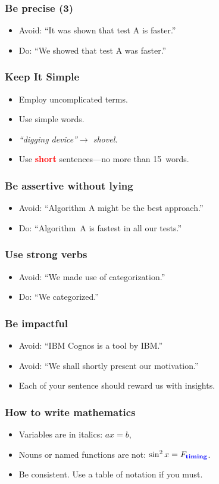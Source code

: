 \documentclass[handout]{beamer}
\newcommand{\vimportant}[1]{\textcolor{red}{\textbf{#1}}}
\newcommand{\important}[1]{\textcolor{blue}{\textbf{#1}}}
\begin{document}
 \frame
{
  \frametitle{Be precise (3)}
  \begin{itemize}
 \item<1->           Avoid: ``It was shown that test A is faster.''
  \item<2-> Do: ``We showed that test A was faster.''
 \end{itemize}
 }

\frame
{
  \frametitle{Keep It Simple}
  \begin{itemize}
  \item<1->  Employ uncomplicated terms.
  \item<2->  Use simple words.
  \item<3-> \emph{``digging device''$\to$  shovel.}
    \item<4->  Use \vimportant{short} sentences---no more than 15~words.
 \end{itemize}
 }


\frame
{
  \frametitle{Be assertive without lying}
  \begin{itemize}
  \item<1-> Avoid: ``Algorithm A might be the best approach.''
  \item<2-> Do: ``Algorithm~A is fastest in all our tests.''
 \end{itemize}
 }

\frame
{
  \frametitle{Use strong verbs}
  \begin{itemize}
  \item<1-> Avoid: ``We made use of categorization.''
  \item<2-> Do: ``We categorized.''
 \end{itemize}
 }

\frame
{
  \frametitle{Be impactful}
  \begin{itemize}
  \item<1-> Avoid: ``IBM Cognos is a tool by IBM.''
  \item<2-> Avoid: ``We shall shortly present our motivation.''
  \item<3-> Each of your sentence should reward us with insights.

 \end{itemize}
 }



\frame
{
  \frametitle{How to write mathematics}
  \begin{itemize}
  \item<1->  Variables are in italics: $a x = b$,
  \item<2-> Nouns or named functions are not: $\sin^2 x = F_{\textrm{\important{timing}}}$.
  \item<3->  Be consistent. Use a table of notation if you must.
  \end{itemize}
}
\end{document}

